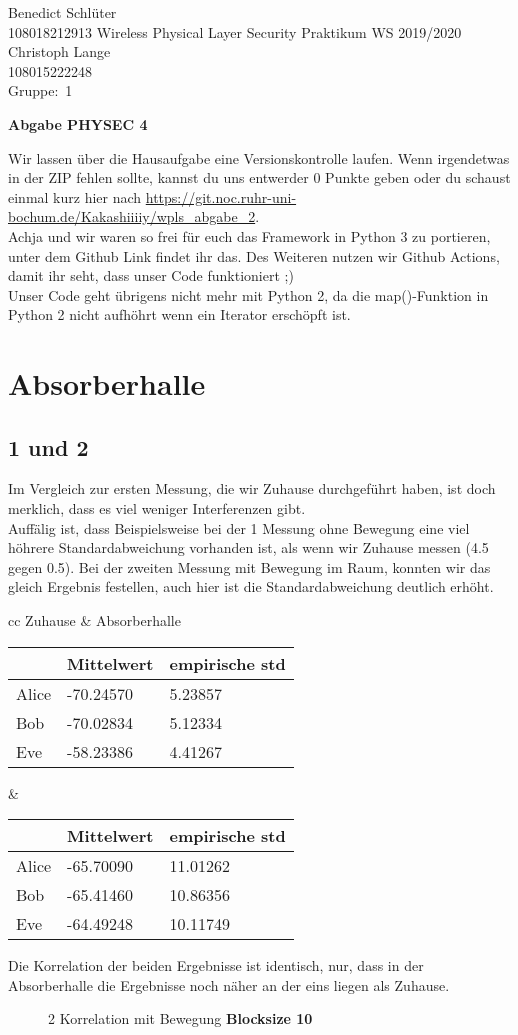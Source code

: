\documentclass[12pt,a4paper]{article}
\newcommand{\student}{Benedict Schlüter\\ 108018212913 } %
\newcommand{\partner}{Christoph Lange\\ 108015222248} %
\newcommand{\group}{1} %
\newcommand{\hwheadtwo}{$ $
  \vspace{-2cm}
  
\noindent \student \qquad \qquad  Wireless Physical Layer Security Praktikum \hfill WS 2019/2020 \\
\noindent \partner \\
\noindent Gruppe:~\group\\
$ $

  
\begin{center}    
{\Large \bf Abgabe PHYSEC 4}
\end{center}
}
\begin{document}
\hwheadtwo
Wir lassen über die Hausaufgabe eine Versionskontrolle laufen. Wenn irgendetwas in der ZIP fehlen sollte, kannst du uns entwerder 0 Punkte geben oder du schaust einmal kurz hier nach \url{https://git.noc.ruhr-uni-bochum.de/Kakashiiiiy/wpls_abgabe_2}.\\
Achja und wir waren so frei für euch das Framework in Python 3 zu portieren, unter dem Github Link findet ihr das. Des Weiteren nutzen wir Github Actions, damit ihr seht, dass unser Code funktioniert ;)\\
Unser Code geht übrigens nicht mehr mit Python 2, da die map()-Funktion in Python 2 nicht aufhöhrt wenn ein Iterator erschöpft ist.
\section{Absorberhalle}
\subsection*{1 und 2 }
Im Vergleich zur ersten Messung, die wir Zuhause durchgeführt haben, ist doch merklich, dass es viel weniger Interferenzen gibt.\\ 
Auffälig ist, dass Beispielsweise bei der 1 Messung ohne Bewegung eine viel höhrere Standardabweichung vorhanden ist, als wenn wir Zuhause messen (4.5 gegen 0.5). Bei der zweiten Messung mit Bewegung im Raum, konnten wir das gleich Ergebnis festellen, auch hier ist die Standardabweichung deutlich erhöht.
\begin{table}[H]
\centering
\begin{tabular}{ cc }
Zuhause & Absorberhalle  \\
\begin{tabular}{l|l|l}
& Mittelwert & empirische std \\
\hline
Alice & -70.24570 & 5.23857 \\
\hline
Bob & -70.02834 & 5.12334 \\
\hline
Eve & -58.23386 & 4.41267 \\
\end{tabular} &
\begin{tabular}{l|l|l}
& Mittelwert & empirische std \\
\hline
Alice & -65.70090 & 11.01262 \\
\hline
Bob & -65.41460 & 10.86356 \\
\hline
Eve & -64.49248 & 10.11749 \\
\end{tabular}
\end{tabular}
\end{table}
Die Korrelation der beiden Ergebnisse ist identisch, nur, dass in der Absorberhalle die Ergebnisse noch näher an der eins liegen als Zuhause.
\begin{figure}[H]
\centering
{}   \qquad
{}
\caption{2 Korrelation mit Bewegung  \textbf{Blocksize 10}}
\label{fig:2}
\end{figure}
\end{document}
